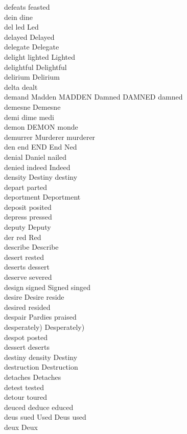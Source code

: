 defeats feasted\\
dein dine\\
del led Led\\
delayed Delayed\\
delegate Delegate\\
delight lighted Lighted\\
delightful Delightful\\
delirium Delirium\\
delta dealt\\
demand Madden MADDEN Damned DAMNED damned\\
demesne Demesne\\
demi dime medi\\
demon DEMON monde\\
demurrer Murderer murderer\\
den end END End Ned\\
denial Daniel nailed\\
denied indeed Indeed\\
density Destiny destiny\\
depart parted\\
deportment Deportment\\
deposit posited\\
depress pressed\\
deputy Deputy\\
der red Red\\
describe Describe\\
desert rested\\
deserts dessert\\
deserve severed\\
design signed Signed singed\\
desire Desire reside\\
desired resided\\
despair Pardies praised\\
desperately) Desperately)\\
despot posted\\
dessert deserts\\
destiny density Destiny\\
destruction Destruction\\
detaches Detaches\\
detest tested\\
detour toured\\
deuced deduce educed\\
deus sued Used Deus used\\
deux Deux\\
